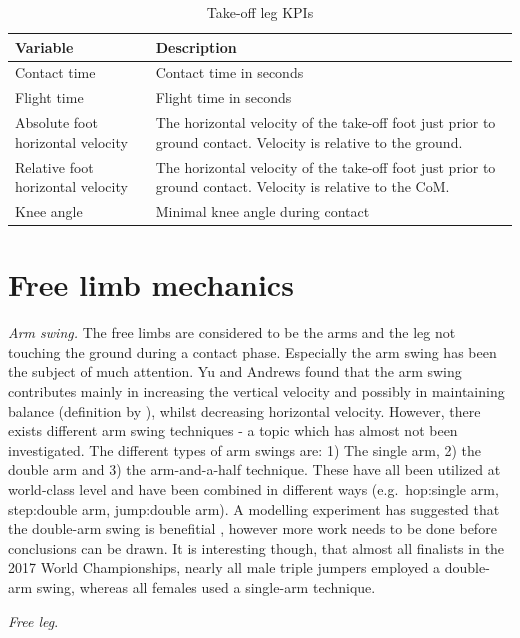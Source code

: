 \documentclass[]{scrreprt}
\begin{document}
\begin{longtable}[t]{>{\raggedright\arraybackslash}p{15em}|l}
\caption{\label{tab:takeoff-desc}Take-off leg KPIs}\\
\hline
Variable & Description\\
\hline
Contact time & Contact time in seconds\\
\hline
Flight time & Flight time in seconds\\
\hline
Absolute foot horizontal velocity & The horizontal velocity of the take-off foot just prior to ground contact. Velocity is relative to the ground.\\
\hline
Relative foot horizontal velocity & The horizontal velocity of the take-off foot just prior to ground contact. Velocity is relative to the CoM.\\
\hline
Knee angle & Minimal knee angle during contact\\
\hline
\end{longtable}

\clearpage

\hypertarget{free-limb-mechanics}{%
\section{Free limb mechanics}\label{free-limb-mechanics}}

\emph{Arm swing.} The free limbs are considered to be the arms and the leg not touching the ground during a contact phase. Especially the arm swing has been the subject of much attention. Yu and Andrews \autocite{Yu1998} found that the arm swing contributes mainly in increasing the vertical velocity and possibly in maintaining balance (definition by \textcite{Hay1993}), whilst decreasing horizontal velocity. However, there exists different arm swing techniques - a topic which has almost not been investigated. The different types of arm swings are: 1) The single arm, 2) the double arm and 3) the arm-and-a-half technique. These have all been utilized at world-class level and have been combined in different ways (e.g.~hop:single arm, step:double arm, jump:double arm). A modelling experiment has suggested that the double-arm swing is benefitial \autocite{Allen2010}, however more work needs to be done before conclusions can be drawn. It is interesting though, that almost all finalists in the 2017 World Championships, nearly all male triple jumpers employed a double-arm swing, whereas all females used a single-arm technique. ~

\emph{Free leg}.
\end{document}
